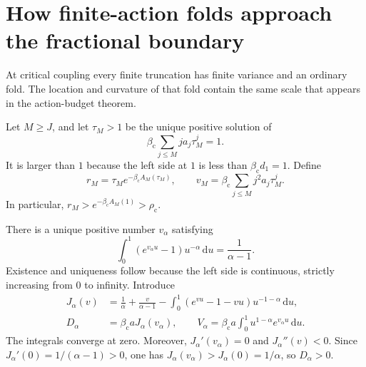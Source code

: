 \documentclass[11pt,a4paper]{article}
\numberwithin{equation}{section}
\theoremstyle{definition}
\theoremstyle{remark}
\newcommand{\dd}{\,\mathrm d}
\newcommand{\bc}{\beta_{\mathrm c}}
\newcommand{\rhoc}{\rho_{\mathrm c}}
\begin{document}
\section{How finite-action folds approach the fractional boundary}
\label{sec:finite-folds}

At critical coupling every finite truncation has finite variance and an
ordinary fold. The location and curvature of that fold contain the same
scale that appears in the action-budget theorem.

Let $M\ge J$, and let $\tau_M>1$ be the unique positive solution of
\begin{equation}\label{eq:finite-critical}
 \bc\sum_{j\le M}j a_j\tau_M^j=1.
\end{equation}
It is larger than $1$ because the left side at $1$ is less than
$\bc d_1=1$. Define
\begin{equation}\label{eq:finite-r-v}
 r_M=\tau_Me^{-\bc A_M(\tau_M)},\qquad
 v_M=\bc\sum_{j\le M}j^2a_j\tau_M^j.
\end{equation}
In particular, $r_M>e^{-\bc A_M(1)}>\rhoc$.

There is a unique positive number $v_\alpha$ satisfying
\begin{equation}\label{eq:v-alpha}
 \int_0^1(e^{v_\alpha u}-1)u^{-\alpha}\dd u
                    =\frac1{\alpha-1}.
\end{equation}
Existence and uniqueness follow because the left side is continuous,
strictly increasing from $0$ to infinity. Introduce
\begin{align}
 J_\alpha(v)&=\frac1\alpha+\frac{v}{\alpha-1}
       -\int_0^1(e^{vu}-1-vu)u^{-1-\alpha}\dd u,
       \label{eq:J-alpha}\\
 D_\alpha&=\bc a J_\alpha(v_\alpha),\qquad
 V_\alpha=\bc a\int_0^1u^{1-\alpha}e^{v_\alpha u}\dd u.
       \label{eq:D-V}
\end{align}
The integrals converge at zero. Moreover,
$J_\alpha'(v_\alpha)=0$ and $J_\alpha''(v)<0$.
Since $J_\alpha'(0)=1/(\alpha-1)>0$, one has
$J_\alpha(v_\alpha)>J_\alpha(0)=1/\alpha$, so $D_\alpha>0$.
\end{document}
